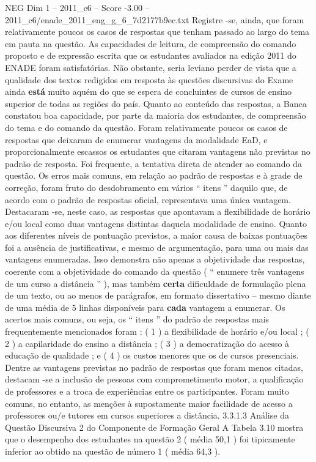 \begin{textsample}{NEG Dim 1 – 2011\_c6 – Score -3.00 – 2011\_c6/enade\_2011\_eng\_g\_6\_7d2177b9ec.txt}
Registre -se, ainda, que foram relativamente poucos os casos de respostas que tenham passado ao largo do tema em pauta na questão.
As capacidades de leitura, de compreensão do comando proposto e de expressão escrita que os estudantes avaliados na edição 2011 do ENADE foram satisfatórias.
Não obstante, seria leviano perder de vista que a qualidade dos textos redigidos em resposta às questões discursivas do Exame ainda \textbf{está} muito aquém do que se espera de concluintes de cursos de ensino superior de todas as regiões do país.
Quanto ao conteúdo das respostas, a Banca constatou boa capacidade, por parte da maioria dos estudantes, de compreensão do tema e do comando da questão.
Foram relativamente poucos os casos de respostas que deixaram de enumerar vantagens da modalidade EaD, e proporcionalmente escassos os estudantes que citaram vantagens não previstas no padrão de resposta.
Foi frequente, a tentativa direta de atender ao comando da questão.
Os erros mais comuns, em relação ao padrão de respostas e à grade de correção, foram fruto do desdobramento em vários “ itens ” daquilo que, de acordo com o padrão de respostas oficial, representava uma única vantagem.
Destacaram -se, neste caso, as respostas que apontavam a flexibilidade de horário e/ou local como duas vantagens distintas daquela modalidade de ensino.
Quanto aos diferentes níveis de pontuação previstos, a maior causa de baixas pontuações foi a ausência de justificativas, e mesmo de argumentação, para uma ou mais das vantagens enumeradas.
Isso demonstra não apenas a objetividade das respostas, coerente com a objetividade do comando da questão ( “ enumere três vantagens de um curso a distância ” ), mas também \textbf{certa} dificuldade de formulação plena de um texto, ou ao menos de parágrafos, em formato dissertativo – mesmo diante de uma média de 5 linhas disponíveis para \textbf{cada} vantagem a enumerar.
Os acertos mais comuns, ou seja, os “ itens ” do padrão de respostas mais frequentemente mencionados foram : ( 1 ) a flexibilidade de horário e/ou local ; ( 2 ) a capilaridade do ensino a distância ; ( 3 ) a democratização do acesso à educação de qualidade ; e ( 4 ) os custos menores que os de cursos presenciais.
Dentre as vantagens previstas no padrão de respostas que foram menos citadas, destacam -se a inclusão de pessoas com comprometimento motor, a qualificação de professores e a troca de experiências entre os participantes.
Foram muito comuns, no entanto, as menções à supostamente maior facilidade de acesso a professores ou/e tutores em cursos superiores a distância. 3.3.1.3 Análise da Questão Discursiva 2 do Componente de Formação Geral A Tabela 3.10 mostra que o desempenho dos estudantes na questão 2 ( média 50,1 ) foi tipicamente inferior ao obtido na questão de número 1 ( média 64,3 ).

\end{textsample}
